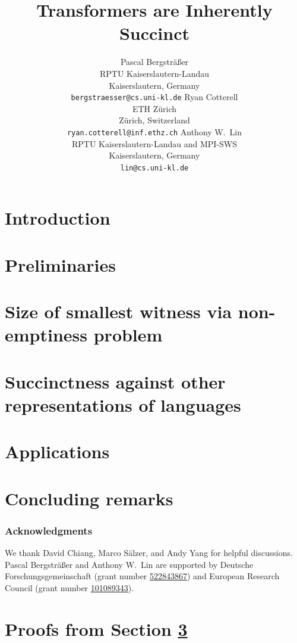 \documentclass{article} %
\title{Transformers are Inherently Succinct}
\author{Pascal Bergsträßer \\
RPTU Kaiserslautern-Landau\\
Kaiserslautern, Germany \\
\texttt{bergstraesser@cs.uni-kl.de}
\And
Ryan Cotterell \\
ETH Zürich \\
Zürich, Switzerland \\
\texttt{ryan.cotterell@inf.ethz.ch}
\And
Anthony W.\ Lin \\
RPTU Kaiserslautern-Landau and MPI-SWS\\
Kaiserslautern, Germany \\
\texttt{lin@cs.uni-kl.de} \\
}
\begin{document}
\maketitle




\section{Introduction}
\label{sec:intro}


\section{Preliminaries}
\label{sec:prelim}


\section{Size of smallest witness via non-emptiness problem}
\label{sec:emptiness}


\section{Succinctness against other representations of languages}
\label{sec:succinctness}



\section{Applications}
\label{sec:apps}


\section{Concluding remarks}
\label{sec:related}





\subsubsection*{Acknowledgments}
We thank David Chiang, Marco Sälzer, and Andy Yang for helpful discussions.
Pascal Bergsträßer and Anthony W.\ Lin are supported by 
Deutsche Forschungsgemeinschaft (grant number \href{https://gepris.dfg.de/gepris/projekt/522843867?language=en}{522843867}) and
European Research Council (grant number \href{https://cordis.europa.eu/project/id/101089343}{101089343}).




\appendix

\section{Proofs from Section \ref{sec:emptiness}}
\label{app:emptiness}

\end{document}
